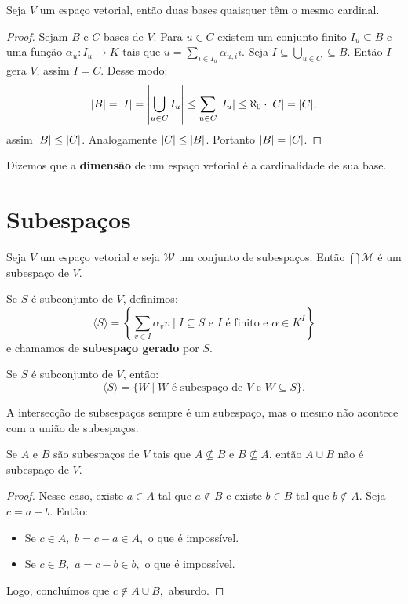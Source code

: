 \documentclass[11pt,twoside,a4paper]{book}
\begin{document}
\begin{teorema}
Seja $V$ um espaço vetorial, então duas bases quaisquer têm o mesmo cardinal.
\end{teorema}
\begin{proof}
Sejam $B$ e $C$ bases de $V$. Para $u\in C$ existem um conjunto finito $I_u\subseteq B$ e uma função $\alpha_u:I_u\rightarrow K$ tais que $u=\sum_{i\in I_u}\alpha_{u,i}i$. Seja $I\subseteq\bigcup_{u\in C}\subseteq B$. Então $I$ gera $V$, assim $I=C$. Desse modo:
\[
\abs{B}=\abs{I}=\abs{\bigcup_{u\in C}I_u}\leq\sum_{u\in C}\abs{I_u}\leq\aleph_0\cdot\abs{C}=\abs{C},
\]
assim $\abs{B}\leq\abs{C}$. Analogamente $\abs{C}\leq\abs{B}$. Portanto $\abs{B}=\abs{C}$.
\end{proof}
\begin{definicao}
Dizemos que a \textbf{dimensão} de um espaço vetorial é a cardinalidade de sua base.
\end{definicao}
\section{Subespaços}

\begin{proposicao}
Seja $V$ um espaço vetorial e seja $\mathcal{W}$ um conjunto de subespaços. Então $\bigcap\mathcal{M}$ é um subespaço de $V$.
\end{proposicao}

\begin{definicao}
Se $S$ é subconjunto de $V$, definimos:
\[
\langle S\rangle=\left\{\sum\limits_{v\in I}\alpha_vv\mid I\subseteq S\text{ e }I\text{ é finito e }\alpha\in K^I\right\}
\]
e chamamos de \textbf{subespaço gerado} por $S$.
\end{definicao}

\begin{proposicao}
Se $S$ é subconjunto de $V$, então:
\[
\langle S\rangle=\{W\mid W\text{ é subespaço de }V\text{ e }W\subseteq S\}.
\]
\end{proposicao}
A intersecção de subsespaços sempre é um subespaço, mas o mesmo não acontece com a união de subespaços.
\begin{proposicao}
Se $A$ e $B$ são subespaços de $V$ tais que $A\nsubseteq B$ e $B\nsubseteq A$, então $A\cup B$ não é subespaço de $V$.
\end{proposicao}
\begin{proof}
Nesse caso, existe $a\in A$ tal que $a\notin B$ e existe $b\in B$ tal que $b\notin A$. Seja $c=a+b$. Então:
\begin{itemize}
    \item Se $c \in A,$ $b = c - a \in A,$ o que é impossível.
    \item Se $c \in B,$ $a = c - b \in b,$ o que é impossível.
\end{itemize}
Logo, concluímos que $c \notin A \cup B,$ absurdo.

\end{proof}
\end{document}

